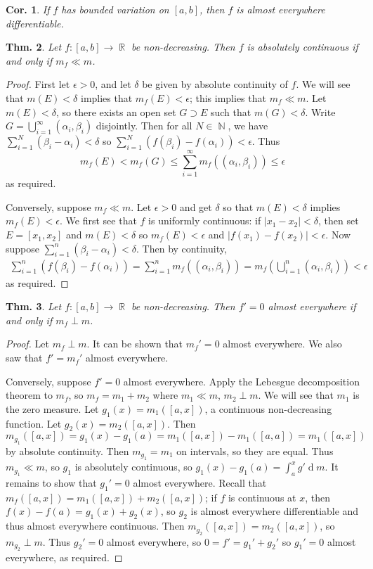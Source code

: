 \documentclass[12pt, a4paper]{book}
\DeclareMathOperator{\N}{\mathbb{N}}
\DeclareMathOperator{\R}{\mathbb{R}}
\renewcommand{\d}[1]{\ensuremath{\operatorname{d}\!{#1}}} %
\newtheorem{theorem}{Thm.}[section]
\newtheorem{corollary}[theorem]{Cor.}
\theoremstyle{nonumberplain}
\newtheorem{proof}{Proof}
\begin{document}
\begin{corollary}
    If $f$ has bounded variation on $[a,b]$, then $f$ is almost everywhere differentiable.
\end{corollary}
\begin{theorem}
    Let $f:[a,b]\to\R$ be non-decreasing.
    Then $f$ is absolutely continuous if and only if $m_f\ll m$.
\end{theorem}
\begin{proof}
    First let $\epsilon>0$, and let $\delta$ be given by absolute continuity of $f$.
    We will see that $m(E)<\delta$ implies that $m_f(E)<\epsilon$; this implies that $m_f\ll m$.
    Let $m(E)<\delta$, so there exists an open set $G\supset E$ such that $m(G)<\delta$.
    Write $G=\bigcup_{i=1}^\infty(\alpha_i,\beta_i)$ disjointly.
    Then for all $N\in\N$, we have $\sum_{i=1}^N(\beta_i-\alpha_i)<\delta$ so $\sum_{i=1}^N(f(\beta_i)-f(\alpha_i))<\epsilon$.
    Thus
    \[m_f(E)<m_f(G)\leq\sum\limits_{i=1}^\infty m_f((\alpha_i,\beta_i))\leq\epsilon\]
    as required.

    Conversely, suppose $m_f\ll m$.
    Let $\epsilon>0$ and get $\delta$ so that $m(E)<\delta$ implies $m_f(E)<\epsilon$.
    We first see that $f$ is uniformly continuous: if $|x_1-x_2|<\delta$, then set $E=[x_1,x_2]$ and $m(E)<\delta$ so $m_f(E)<\epsilon$ and $|f(x_1)-f(x_2)|<\epsilon$.
    Now suppose $\sum_{i=1}^n(\beta_i-\alpha_i)<\delta$.
    Then by continuity,
    \begin{align*}
        \sum\limits_{i=1}^n(f(\beta_i)-f(\alpha_i)) =\sum\limits_{i=1}^n m_f((\alpha_i,\beta_i))=m_f\left(\bigcup\limits_{i=1}^n(\alpha_i,\beta_i)\right)<\epsilon
    \end{align*}
    as required.
\end{proof}
\begin{theorem}
    Let $f:[a,b]\to\R$ be non-decreasing.
    Then $f'=0$ almost everywhere if and only if $m_f\perp m$.
\end{theorem}
\begin{proof}
    Let $m_f\perp m$.
    It can be shown that $m_f'=0$ almost everywhere.
    We also saw that $f'=m_f'$ almost everywhere.

    Conversely, suppose $f'=0$ almost everywhere.
    Apply the Lebesgue decomposition theorem to $m_f$, so $m_f=m_1+m_2$ where $m_1\ll m$, $m_2\perp m$.
    We will see that $m_1$ is the zero measure.
    Let $g_1(x)=m_1([a,x])$, a continuous non-decreasing function.
    Let $g_2(x)=m_2([a,x])$.
    Then $m_{g_1}([a,x])=g_1(x)-g_1(a)=m_1([a,x])-m_1([a,a])=m_1([a,x])$ by absolute continuity.
    Then $m_{g_1}=m_1$ on intervals, so they are equal.
    Thus $m_{g_1}\ll m$, so $g_1$ is absolutely continuous, so $g_1(x)-g_1(a)=\int_a^x g'\d{m}$.
    It remains to show that $g_1'=0$ almost everywhere.
    Recall that $m_f([a,x])=m_1([a,x])+m_2([a,x])$; if $f$ is continuous at $x$, then $f(x)-f(a)=g_1(x)+g_2(x)$, so $g_2$ is almost everywhere differentiable and thus almost everywhere continuous.
    Then $m_{g_2}([a,x])=m_2([a,x])$, so $m_{g_2}\perp m$.
    Thus $g_2'=0$ almost everywhere, so $0=f'=g_1'+g_2'$ so $g_1'=0$ almost everywhere, as required.
\end{proof}
\end{document}
